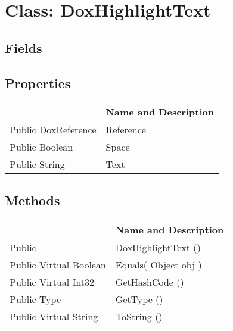 \documentclass[11pt, oneside, a4paper]{book}
\begin{document}
\hypertarget{SoftwareEngineeringTools.{}Documentation.{}DoxHighlightText}{}
\section{Class: DoxHighlightText}

\subsection{Fields}

\subsection{Properties}
\begin{center}
\begin{tabular}{| p{3cm} | p{12cm} | }
\hline
\textbf{ } & \textbf{ Name and Description}\\
\hline
 Public  DoxReference &  Reference\hypertarget{SoftwareEngineeringTools.{}Documentation.{}DoxHighlightText.{}Reference}{}\\
\hline
 Public  Boolean &  Space\hypertarget{SoftwareEngineeringTools.{}Documentation.{}DoxHighlightText.{}Space}{}\\
\hline
 Public  String &  Text\hypertarget{SoftwareEngineeringTools.{}Documentation.{}DoxHighlightText.{}Text}{}\\
\hline
\end{tabular}
\end{center}

\subsection{Methods}
\begin{center}
\begin{tabular}{| p{3cm} | p{12cm} | }
\hline
\textbf{ } & \textbf{ Name and Description}\\
\hline
 Public  &  DoxHighlightText ()\hypertarget{SoftwareEngineeringTools.{}Documentation.{}DoxHighlightText.{}DoxHighlightText}{}\\
\hline
 Public  Virtual  Boolean &  Equals(\hypertarget{SoftwareEngineeringTools.{}Documentation.{}DoxHighlightText.{}Equals\_Object}{} Object  obj  )\\
\hline
 Public  Virtual  Int32 &  GetHashCode ()\hypertarget{SoftwareEngineeringTools.{}Documentation.{}DoxHighlightText.{}GetHashCode}{}\\
\hline
 Public  Type &  GetType ()\hypertarget{SoftwareEngineeringTools.{}Documentation.{}DoxHighlightText.{}GetType}{}\\
\hline
 Public  Virtual  String &  ToString ()\hypertarget{SoftwareEngineeringTools.{}Documentation.{}DoxHighlightText.{}ToString}{}\\
\hline
\end{tabular}
\end{center}
 
\end{document}
